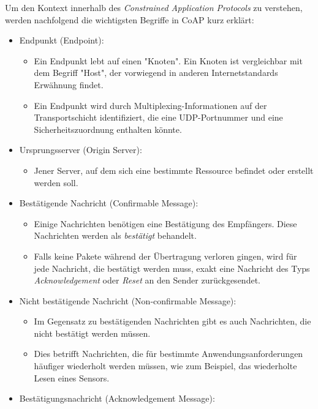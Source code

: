 Um den Kontext innerhalb des \textit{Constrained Application Protocols} zu verstehen, werden nachfolgend die wichtigsten Begriffe in CoAP kurz erklärt:
\begin{itemize}
    \item Endpunkt (Endpoint):
          \begin{itemize}
              \item Ein Endpunkt lebt auf einen "Knoten". Ein Knoten ist vergleichbar mit dem Begriff "Host", der vorwiegend in anderen Internetstandards Erwähnung findet.
              \item Ein Endpunkt wird durch Multiplexing-Informationen auf der Transportschicht identifiziert, die eine UDP-Portnummer und eine Sicherheitszuordnung enthalten könnte.
          \end{itemize}
    \item Ursprungsserver (Origin Server):
          \begin{itemize}
              \item Jener Server, auf dem sich eine bestimmte Ressource befindet oder erstellt werden soll.
          \end{itemize}
    \item Bestätigende Nachricht (Confirmable Message):
          \begin{itemize}
              \item Einige Nachrichten benötigen eine Bestätigung des Empfängers. Diese Nachrichten werden als \textit{bestätigt} behandelt.
              \item Falls keine Pakete während der Übertragung verloren gingen, wird für jede Nachricht, die bestätigt werden muss, exakt eine Nachricht des Typs \textit{Acknowledgement} oder \textit{Reset} an den Sender zurückgesendet.
          \end{itemize}
    \item Nicht bestätigende Nachricht (Non-confirmable Message):
          \begin{itemize}
              \item Im Gegensatz zu bestätigenden Nachrichten gibt es auch Nachrichten, die nicht bestätigt werden müssen.
              \item Dies betrifft Nachrichten, die für bestimmte Anwendungsanforderungen häufiger wiederholt werden müssen, wie zum Beispiel, das wiederholte Lesen eines Sensors.
          \end{itemize}
    \item Bestätigungsnachricht (Acknowledgement Message):

\end{itemize}
